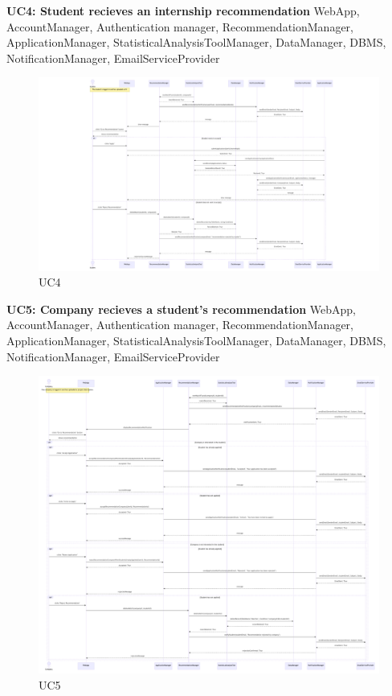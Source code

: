 \newpage
\textbf{UC4: Student recieves an internship recommendation}
WebApp, AccountManager, Authentication manager, RecommendationManager, ApplicationManager, StatisticalAnalysisToolManager, DataManager, DBMS, NotificationManager, EmailServiceProvider

\begin{figure}[H]
    \centering
    \hspace{-1cm} %
    \includegraphics[width=1.1\linewidth]{DD//Images/SequenceDiagrams/UC4.pdf}
    \caption{UC4}
\end{figure}

\newpage
\textbf{UC5: Company recieves a student's recommendation}
WebApp, AccountManager, Authentication manager, RecommendationManager, ApplicationManager, StatisticalAnalysisToolManager, DataManager, DBMS, NotificationManager, EmailServiceProvider

\begin{figure}[H]
    \centering
    \hspace{-1 cm} %
    \includegraphics[width=1.1\linewidth]{DD//Images/SequenceDiagrams/UC5.pdf}
    \caption{UC5}
\end{figure}

